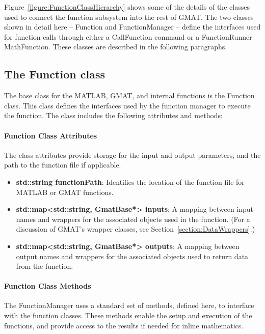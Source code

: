 Figure~\ref{figure:FunctionClassHierarchy} shows some of the details of the classes used to connect
the function subsystem into the rest of GMAT.  The two classes shown in detail here -- Function and
FunctionManager -- define the interfaces used for function calls through either a CallFunction
command or a FunctionRunner MathFunction.  These classes are described in the following paragraphs.

\subsection{The Function class}

The base class for the MATLAB, GMAT, and internal functions is the Function class.  This class
defines the interfaces used by the function manager to execute the function.  The class includes
the following attributes and methods:

\paragraph{Function Class Attributes}

The class attributes provide storage for the input and output parameters, and the path to the
function file if applicable.

\begin{itemize}
\item \textbf{std::string functionPath}: Identifies the location of the function file for MATLAB or
GMAT functions.
\item \textbf{std::map<std::string, GmatBase*> inputs}: A mapping between input names and
wrappers for the associated objects used in the function.  (For a discussion of GMAT's wrapper
classes, see Section~\ref{section:DataWrappers}.)
\item \textbf{std::map<std::string, GmatBase*> outputs}: A mapping between output names and wrappers
for the associated objects used to return data from the function.
\end{itemize}

\paragraph{Function Class Methods}

The FunctionManager uses a standard set of methods, defined here, to interface with the function
classes.  These methods enable the setup and execution of the functions, and provide access to the
results if needed for inline mathematics.

